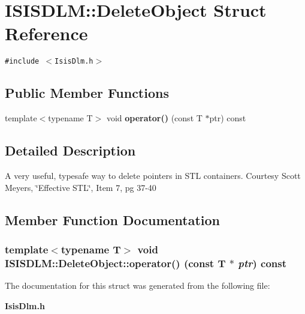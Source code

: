 \section{ISISDLM::Delete\-Object Struct Reference}
\label{structISISDLM_1_1DeleteObject}
{\tt \#include $<$Isis\-Dlm.h$>$}

\subsection*{Public Member Functions}
\begin{CompactItemize}
\item 
template$<$typename T$>$ void {\bf operator()} (const T $\ast$ptr) const
\end{CompactItemize}


\subsection{Detailed Description}
A very useful, typesafe way to delete pointers in STL containers. Courtesy Scott Meyers, \char`\"{}Effective STL\char`\"{}, Item 7, pg 37-40 



\subsection{Member Function Documentation}
\subsubsection{\setlength{\rightskip}{0pt plus 5cm}template$<$typename T$>$ void ISISDLM::Delete\-Object::operator() (const T $\ast$ {\em ptr}) const\hspace{0.3cm}{\tt  [inline]}}\label{structISISDLM_1_1DeleteObject_a0}




The documentation for this struct was generated from the following file:\begin{CompactItemize}
\item 
{\bf Isis\-Dlm.h}\end{CompactItemize}

